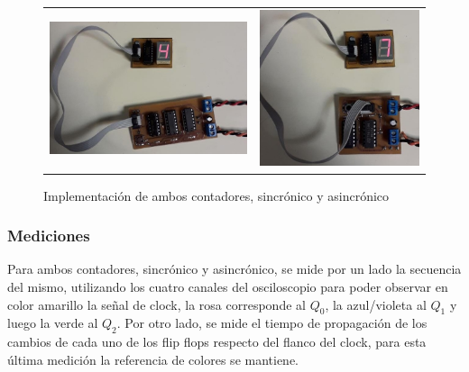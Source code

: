 \begin{figure}[H]
    \centering
        \begin{tabular}{c c}
            \includegraphics[scale=0.3]{../EJ7/Recursos/practica_0.jpeg} &
            \includegraphics[scale=0.3]{../EJ7/Recursos/practica_1.jpeg}
        \end{tabular}
    \caption{Implementaci\'on de ambos contadores, sincr\'onico y asincr\'onico}
    \label{fig:implementacion}
\end{figure}

\subsubsection{Mediciones}
Para ambos contadores, sincr\'onico y asincr\'onico, se mide por un lado la secuencia del mismo, utilizando los cuatro canales del osciloscopio
para poder observar en color amarillo la se\~nal de clock, la rosa corresponde al $Q_0$, la azul/violeta al $Q_1$ y luego la verde al $Q_2$. Por otro lado,
se mide el tiempo de propagaci\'on de los cambios de cada uno de los flip flops respecto del flanco del clock, para esta \'ultima medici\'on la referencia de colores se mantiene.

